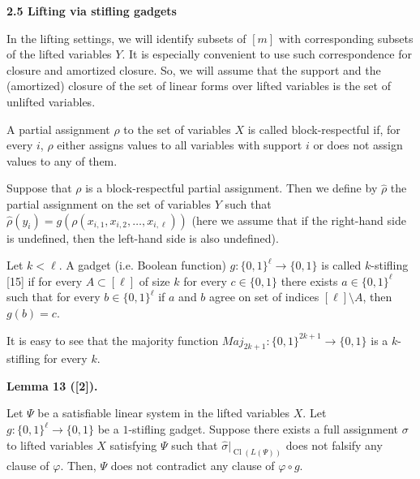 \documentclass[10pt,a4paper]{article}
\begin{document}
\par\medskip\noindent\textbf{
2.5 Lifting via stifling gadgets}\par


In the lifting settings, we will identify subsets of $[m]$ with corresponding subsets of the
lifted variables $Y$.
It is especially convenient to use such correspondence for closure and amortized closure.
So, we will assume that the support and the (amortized) closure of the set of linear forms over
lifted variables is the set of unlifted variables.\par



A partial assignment $\rho$ to the set of variables $X$ is called block-respectful if,
for every $i$, $\rho$ either assigns values to all variables with support $i$ or does not assign
values to any of them.\par



Suppose that $\rho$ is a block-respectful partial assignment.
Then we define by $\hat{\rho}$ the partial assignment on the set of variables $Y$ such that
$\hat{\rho}(y_{i})=g(\rho(x_{i,1},x_{i,2},\dots,x_{i,\ell}))$ (here we assume that if the
right-hand side is undefined, then the left-hand side is also undefined).\par



Let $k<\ell$. A gadget (i.e. Boolean function) $g:\{0,1\}^{\ell}\to\{0,1\}$ is called
$k$-stifling [15] if for every $A\subset[\ell]$ of size $k$ for every
$c\in\{0,1\}$ there exists $a\in\{0,1\}^{\ell}$ such that for every $b\in\{0,1\}^{\ell}$
if $a$ and $b$ agree on set of indices $[\ell]\setminus A$, then $g(b)=c$.\par



It is easy to see that the majority function $Maj_{2k+1}:\{0,1\}^{2k+1}\to\{0,1\}$
is a $k$-stifling for every $k$.\par



\par\medskip\noindent\textbf{
Lemma 13 ([2]).
}\par



Let $\Psi$ be a satisfiable linear system in the lifted variables $X$.
Let $g\colon\{0,1\}^{\ell}\to\{0,1\}$ be a $1$-stifling gadget.
Suppose there exists a full assignment $\sigma$ to lifted variables $X$ satisfying
$\Psi$ such that $\hat{\sigma}|_{\operatorname{Cl}(L(\Psi))}$ does not falsify any clause of $\varphi$.
Then, $\Psi$ does not contradict any clause of $\varphi\circ g$.\par
\end{document}
